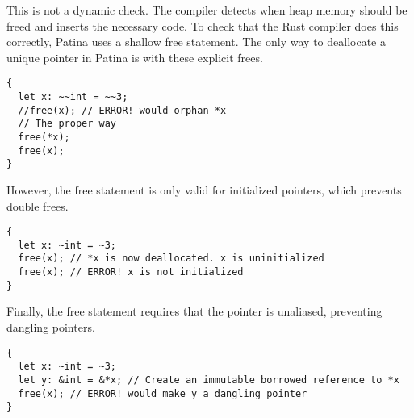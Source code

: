 This is not a dynamic check. 
The compiler detects when heap memory should be freed and inserts the necessary code.
To check that the Rust compiler does this correctly, Patina uses a shallow free statement.
The only way to deallocate a unique pointer in Patina is with these explicit frees.
\begin{verbatim}
{
  let x: ~~int = ~~3;
  //free(x); // ERROR! would orphan *x
  // The proper way
  free(*x);
  free(x);
}
\end{verbatim}
However, the free statement is only valid for initialized pointers, which prevents double frees.
\begin{verbatim}
{
  let x: ~int = ~3;
  free(x); // *x is now deallocated. x is uninitialized
  free(x); // ERROR! x is not initialized
}
\end{verbatim}
Finally, the free statement requires that the pointer is unaliased, preventing dangling pointers.
\begin{verbatim}
{
  let x: ~int = ~3;
  let y: &int = &*x; // Create an immutable borrowed reference to *x
  free(x); // ERROR! would make y a dangling pointer
}
\end{verbatim}

